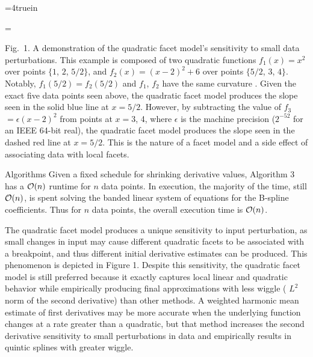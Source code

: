 \topinsert
\centerline{\epsfxsize=4truein }
{\everymath={\scriptstyle}

\narrower\noindent\rmVIII Fig.\ 1. A demonstration of the quadratic
  facet model's sensitivity to small data perturbations. This example is
  composed of two quadratic functions $f_1(x) = x^2$ over points $\{1$,
  $2$, $5/2\}$, and $f_2(x) = (x-2)^2 + 6$ over points $\{5/2$, $3$,
  $4\}$. Notably, $f_1(5/2) = f_2(5/2)$ and $f_1$, $f_2$ have the same
  curvature . Given the exact five data points
  seen above, the quadratic facet model produces the slope seen in the
  solid blue line at $x = 5/2$. However, by subtracting the value of
  $f_3$ $= \epsilon(x-2)^2$ from points at $x = 3$, 4, where $\epsilon$
  is the machine precision ($2^{-52}$ for an IEEE 64-bit real), the
  quadratic facet model produces the slope seen in the dashed red line
  at $x = 5/2$. This is the nature of a facet model and a side effect
  of associating data with local facets.
\par} \endinsert


Algorithms  Given a fixed
schedule for shrinking derivative values, Algorithm 3 has a ${\cal
  O}(n)$ runtime for $n$ data points. In execution, the majority of
the time, still ${\cal O}(n)$, is spent solving the banded linear
system of equations for the B-spline coefficients. Thus for $n$ data
points, the overall execution time is ${\cal O}(n)$.

The quadratic facet model produces a unique sensitivity to input
perturbation, as small changes in input may cause different quadratic
facets to be associated with a breakpoint, and thus different initial
derivative estimates can be produced. This phenomenon is depicted in
Figure 1. Despite this sensitivity, the quadratic facet model is still
preferred because it exactly captures local linear and quadratic
behavior while empirically producing final approximations with less
wiggle ( $L^2$ norm of the second derivative) than other methods. A
weighted harmonic mean estimate of first derivatives may be more
accurate when the underlying function changes at a rate greater than a
quadratic, but that method increases the second derivative sensitivity
to small perturbations in data and empirically results in quintic
splines with greater wiggle.

